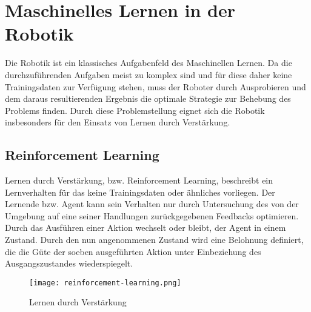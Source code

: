 \chapter{Maschinelles Lernen in der Robotik}

Die Robotik ist ein klassisches Aufgabenfeld des Maschinellen Lernen. Da die durch\-zu\-führenden Aufgaben meist zu komplex sind und für diese daher keine Trainingsdaten zur Verfügung stehen, muss der Roboter durch Ausprobieren und dem daraus resultierenden Ergebnis die optimale Strategie zur Behebung des Problems finden. Durch diese Problemstellung eignet sich die Robotik insbesonders für den Einsatz von Lernen durch Verstärkung. \cite{Ertel_2013}

\section{Reinforcement Learning}

Lernen durch Verstärkung, bzw. Reinforcement Learning, beschreibt ein Lernverhalten für das keine Trainingsdaten oder ähnliches vorliegen. Der Lernende bzw. Agent kann sein Verhalten nur durch Untersuchung des von der Umgebung auf eine seiner Handlungen zurückgegebenen Feedbacks optimieren. Durch das Ausführen einer Aktion wechselt oder bleibt, der Agent in einem Zustand. Durch den nun angenommenen Zustand wird eine Belohnung definiert, die die Güte der soeben ausgeführten Aktion unter Einbeziehung des Ausgangszustandes wiederspiegelt. \cite{Ertel_2013}\par

\begin{figure}[H]
	\centering
	\texttt{[image: reinforcement-learning.png]}
	\caption{Lernen durch Verstärkung}
	\label{fig:reinforcement-learning}
\end{figure}


